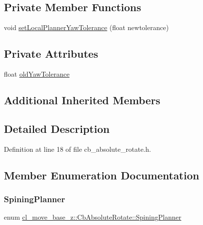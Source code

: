 \subsection*{Private Member Functions}
\begin{DoxyCompactItemize}
\item 
void \hyperlink{classcl__move__base__z_1_1CbAbsoluteRotate_aba8d93d615ccd43acd0684f8e88e2209}{set\+Local\+Planner\+Yaw\+Tolerance} (float newtolerance)
\end{DoxyCompactItemize}
\subsection*{Private Attributes}
\begin{DoxyCompactItemize}
\item 
float \hyperlink{classcl__move__base__z_1_1CbAbsoluteRotate_a2cfcd2978e7923494e2e66107e134e27}{old\+Yaw\+Tolerance}
\end{DoxyCompactItemize}
\subsection*{Additional Inherited Members}


\subsection{Detailed Description}


Definition at line 18 of file cb\+\_\+absolute\+\_\+rotate.\+h.



\subsection{Member Enumeration Documentation}
\mbox{\label{classcl__move__base__z_1_1CbAbsoluteRotate_ab8d45e43594a3fc6a71c08f07b5dbef0}} 
\subsubsection{\texorpdfstring{Spining\+Planner}{SpiningPlanner}}
{\footnotesize\ttfamily enum \hyperlink{classcl__move__base__z_1_1CbAbsoluteRotate_ab8d45e43594a3fc6a71c08f07b5dbef0}{cl\+\_\+move\+\_\+base\+\_\+z\+::\+Cb\+Absolute\+Rotate\+::\+Spining\+Planner}\hspace{0.3cm}{\ttfamily [strong]}}

